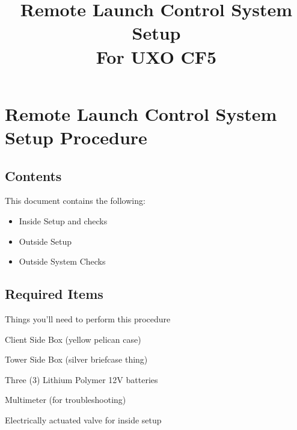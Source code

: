 

\title{
\Huge Remote Launch Control System Setup\\
\vspace{1cm}
\Large For UXO CF5}








\section{Remote Launch Control System Setup Procedure}


\subsection{Contents}
This document contains the following:
\begin{itemize}
    \item Inside Setup and checks
    \item Outside Setup
    \item Outside System Checks
\end{itemize}

\subsection{Required Items}
Things you'll need to perform this procedure
\begin{checklist}
    \item Client Side Box (yellow pelican case)
    \item Tower Side Box (silver briefcase thing)
    \item Three (3) Lithium Polymer 12V batteries
    \item Multimeter (for troubleshooting)
    \item Electrically actuated valve for inside setup
\end{checklist}

